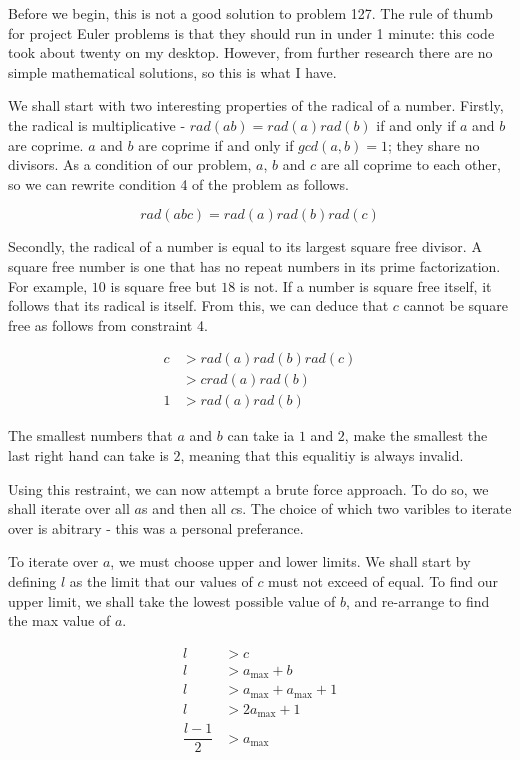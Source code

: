 Before we begin, this is not a good solution to problem 127. The rule of thumb for project Euler problems is that they should run in under 1 minute: this code took about twenty on my desktop. However, from further research there are no simple mathematical solutions, so this is what I have.

We shall start with two interesting properties of the radical of a number. Firstly, the radical is multiplicative - $rad(a b) = rad(a) rad(b)$ if and only if $a$ and $b$ are coprime. $a$ and $b$ are coprime if and only if $gcd(a,b) = 1$; they share no divisors. As a condition of our problem, $a$, $b$ and $c$ are all coprime to each other, so we can rewrite condition 4 of the problem as follows.

\begin{equation}
rad(abc) = rad(a) rad (b) rad (c)
\end{equation}

Secondly, the radical of a number is equal to its largest square free divisor. A square free number is one that has no repeat numbers in its prime factorization. For example, $10$ is square free but $18$ is not. If a number is square free itself, it follows that its radical is itself. From this, we can deduce that $c$ cannot be square free as follows from constraint 4.

\begin{align}
	c &> rad(a) rad(b) rad(c) \\
	&> c rad(a) rad(b) \\
	1 &> rad(a) rad(b)
\end{align}

The smallest numbers that $a$ and $b$ can take ia $1$ and $2$, make the smallest the last right hand can take is $2$, meaning that this equalitiy is always invalid.

Using this restraint, we can now attempt a brute force approach. To do so, we shall iterate over all $a$s and then all $c$s. The choice of which two varibles to iterate over is abitrary - this was a personal preferance.

To iterate over $a$, we must choose upper and lower limits. We shall start by defining $l$ as the limit that our values of $c$ must not exceed of equal. To find our upper limit, we shall take the lowest possible value of $b$, and re-arrange to find the max value of $a$.

\begin{align}
	l &> c \\
	l &> a_{\text{max}} + b \\
	l &> a_\text{max} + a_\text{max} + 1 \\
	l &> 2 a_\text{max} + 1 \\
	\dfrac{l - 1}{2} &> a_\text{max}
\end{align}


